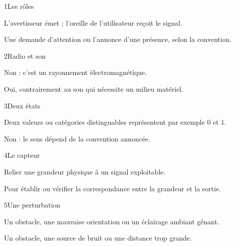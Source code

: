 \par\noindent\begin{minipage}{\linewidth}
\begin{corrige}{1}{Les rôles}
\begin{questions}
\item L’avertisseur émet ; l’oreille de l’utilisateur reçoit le signal.
\item Une demande d’attention ou l’annonce d’une présence, selon la convention.
\end{questions}
\end{corrige}
\end{minipage}
\par\noindent\begin{minipage}{\linewidth}
\begin{corrige}{2}{Radio et son}
\begin{questions}
\item Non : c’est un rayonnement électromagnétique.
\item Oui, contrairement au son qui nécessite un milieu matériel.
\end{questions}
\end{corrige}
\end{minipage}
\par\noindent\begin{minipage}{\linewidth}
\begin{corrige}{3}{Deux états}
\begin{questions}
\item Deux valeurs ou catégories distinguables représentent par exemple 0 et 1.
\item Non : le sens dépend de la convention annoncée.
\end{questions}
\end{corrige}
\end{minipage}
\par\noindent\begin{minipage}{\linewidth}
\begin{corrige}{4}{Le capteur}
\begin{questions}
\item Relier une grandeur physique à un signal exploitable.
\item Pour établir ou vérifier la correspondance entre la grandeur et la sortie.
\end{questions}
\end{corrige}
\end{minipage}
\par\noindent\begin{minipage}{\linewidth}
\begin{corrige}{5}{Une perturbation}
\begin{questions}
\item Un obstacle, une mauvaise orientation ou un éclairage ambiant gênant.
\item Un obstacle, une source de bruit ou une distance trop grande.
\end{questions}
\end{corrige}
\end{minipage}
